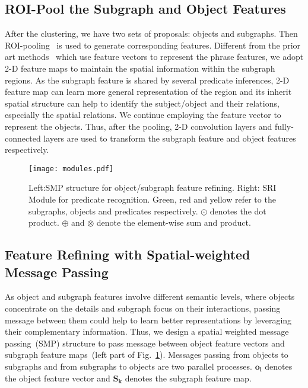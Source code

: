 \documentclass[runningheads]{llncs}
\begin{document}
\subsection{ROI-Pool the Subgraph and Object Features}
After the clustering, we have two sets of proposals: objects and subgraphs. Then ROI-pooling~\cite{fast_rcnn,he2017mask} is used to generate corresponding features. Different from the prior art methods~\cite{xu2017scene,li2017scene} which use feature vectors to represent the phrase features, we adopt 2-D feature maps to maintain the spatial information within the subgraph regions. As the subgraph feature is shared by several predicate inferences, 2-D feature map can learn more general representation of the region and its inherit spatial structure can help to identify the subject/object and their relations, especially the spatial relations. We continue employing the feature vector to represent the objects. Thus, after the pooling, 2-D convolution layers and fully-connected layers are used to transform the subgraph feature and object features respectively. 



\begin{figure}[t]
	\texttt{[image: modules.pdf]}
	\caption{Left:SMP structure for object/subgraph feature refining. Right: SRI Module for predicate recognition. Green, red and yellow  refer to the subgraphs, objects and predicates respectively. $\odot$ denotes the dot product. $\oplus$ and $\otimes$ denote the element-wise sum and product.}
	\label{fig:modules}
\end{figure}


\subsection{Feature Refining with Spatial-weighted Message Passing} 
As object and subgraph features involve different semantic levels, where objects concentrate on the details and subgraph focus on their interactions, passing message between them could help to learn better representations by leveraging their complementary information. Thus, we design a spatial weighted message passing~(SMP) structure to pass message between object feature vectors and subgraph feature maps~(left part of Fig.~\ref{fig:modules}). Messages passing from objects to subgraphs and from subgraphs to objects are two parallel processes. $\mathbf{o_i}$ denotes the object feature vector and $\mathbf{S_k}$ denotes the subgraph feature map. 
\end{document}
